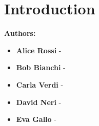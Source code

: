 \section{Introduction}
          
        \begin{minipage}{0.45\textwidth}
            \centering
            \textbf{Authors:}\\[0.5cm]
            \begin{itemize}
                \item \textbf{Alice Rossi} -
                \item \textbf{Bob Bianchi} -
                \item \textbf{Carla Verdi} -
                \item \textbf{David Neri} -
                \item \textbf{Eva Gallo} -
            \end{itemize}
        \end{minipage}
        \vspace{1cm}